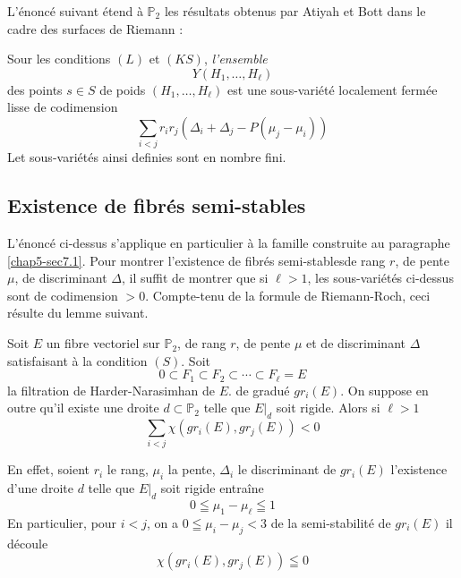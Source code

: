 L'\'enonc\'e suivant \'etend \`a $\mathbb{P}_{2}$ les r\'esultats
obtenus par Atiyah et Bott dans le cadre des surfaces de
Riemann \cite{chap5-key1}: 

\begin{proposition}\label{chap5-prop6}
Sour les conditions $(L)$ et $(KS)$, {\em l'ensemble}
$$
Y(H_{1},\ldots,H_{\ell})
$$ 
des points $s\in S$ de poids
$(H_{1},\ldots,H_{\ell})$ est une sous-vari\'et\'e localement ferm\'ee
lisse de codimension
$$
\sum_{i<j}r_{i}r_{j}(\Delta_{i}+\Delta_{j}-P(\mu_{j}-\mu_{i}))
$$
Let sous-vari\'et\'es ainsi definies sont en nombre fini.
\end{proposition}

\subsection{Existence de fibr\'es semi-stables}

L'\'enonc\'e ci-dessus s'applique en particulier \`a la famille
construite au paragraphe \ref{chap5-sec7.1}. Pour montrer l'existence
de fibr\'es semi-stables\pageoriginale de rang $r$, de pente $\mu$, de
discriminant $\Delta$, il suffit de montrer que si $\ell>1$, les
sous-vari\'et\'es ci-dessus sont de codimension $>0$. Compte-tenu de
la formule de Riemann-Roch, ceci r\'esulte du lemme suivant. 

\begin{lemma}\label{chap5-lem2}
Soit $E$ un fibre vectoriel sur $\mathbb{P}_{2}$, de rang $r$, de
pente $\mu$ et de discriminant $\Delta$ satisfaisant \`a la condition
$(S)$. Soit
$$
0\subset F_{1}\subset F_{2}\subset\cdots\subset F_{\ell}=E
$$
la filtration de Harder-Narasimhan de $E$. de gradu\'e $gr_{i}(E)$. On
suppose en outre qu'il existe une droite $d\subset \mathbb{P}_{2}$
telle que $E|_{d}$ soit rigide. Alors si $\ell>1$
$$
\sum\limits_{i<j}\chi(gr_{i}(E),gr_{j}(E))<0
$$
\end{lemma}

En effet, soient $r_{i}$ le rang, $\mu_{i}$ la pente, $\Delta_{i}$ le
discriminant de $gr_{i}(E)$ l'existence d'une droite $d$ telle que
$E|_{d}$ soit rigide entra\^ine
$$
0\leqq \mu_{1}-\mu_{\ell}\leqq 1
$$
En particulier, pour $i<j$, on a $0\leqq \mu_{i}-\mu_{j}<3$ de la
semi-stabilit\'e de $gr_{i}(E)$ il d\'ecoule
$$
\chi(gr_{i}(E),gr_{j}(E))\leqq 0
$$

